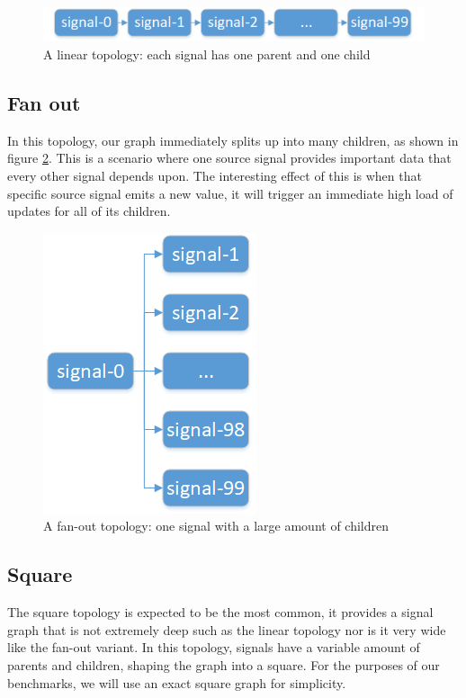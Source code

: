 \begin{figure}[h]
	\centerline{\includegraphics[scale=0.7]{images/Evaluation-Topologies-Linear.png}}
	\caption{A linear topology: each signal has one parent and one child}
	\label{fig:evaluation-topologies-linear}
\end{figure}

\subsection{Fan out}

In this topology, our graph immediately splits up into many children, as shown in figure \ref{fig:evaluation-topologies-fanout}. This is a scenario where one source signal provides important data that every other signal depends upon. The interesting effect of this is when that specific source signal emits a new value, it will trigger an immediate high load of updates for all of its children. 

\begin{figure}[h]
	\centerline{\includegraphics[scale=0.7]{images/Evaluation-Topologies-Fanout.png}}
	\caption{A fan-out topology: one signal with a large amount of children}
	\label{fig:evaluation-topologies-fanout}
\end{figure}

\subsection{Square}

The square topology is expected to be the most common, it provides a signal graph that is not extremely deep such as the linear topology nor is it very wide like the fan-out variant. In this topology, signals have a variable amount of parents and children, shaping the graph into a square. For the purposes of our benchmarks, we will use an exact square graph for simplicity.  

